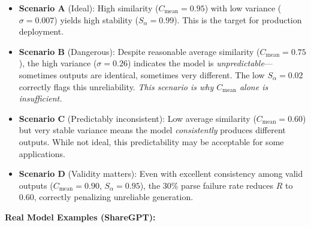 \documentclass{article}
\theoremstyle{plain}
\theoremstyle{definition}
\begin{document}
\begin{itemize}[leftmargin=*, nosep]
\item \textbf{Scenario A} (Ideal): High similarity ($C_{\text{mean}}=0.95$) with low variance ($\sigma=0.007$) yields high stability ($S_\alpha=0.99$). This is the target for production deployment.

\item \textbf{Scenario B} (Dangerous): Despite reasonable average similarity ($C_{\text{mean}}=0.75$), the high variance ($\sigma=0.26$) indicates the model is \textit{unpredictable}---sometimes outputs are identical, sometimes very different. The low $S_\alpha=0.02$ correctly flags this unreliability. \textit{This scenario is why $C_{\text{mean}}$ alone is insufficient.}

\item \textbf{Scenario C} (Predictably inconsistent): Low average similarity ($C_{\text{mean}}=0.60$) but very stable variance means the model \textit{consistently} produces different outputs. While not ideal, this predictability may be acceptable for some applications.

\item \textbf{Scenario D} (Validity matters): Even with excellent consistency among valid outputs ($C_{\text{mean}}=0.90$, $S_\alpha=0.95$), the 30\% parse failure rate reduces $R$ to 0.60, correctly penalizing unreliable generation.
\end{itemize}

\textbf{Real Model Examples (ShareGPT):}
\end{document}
